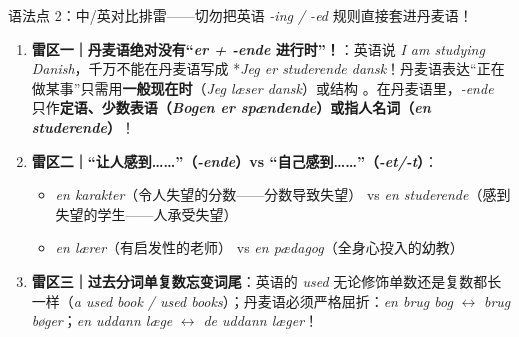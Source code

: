 \begin{grammatikbox}{语法点 2：中/英对比排雷——切勿把英语 \textit{-ing / -ed} 规则直接套进丹麦语！}
\begin{enumerate}
  \item \textbf{雷区一｜丹麦语绝对没有“\textit{er + -ende} 进行时”！}：英语说 \textit{I am studying Danish}，千万不能在丹麦语写成 *\textit{Jeg er studerende dansk}！丹麦语表达“正在做某事”只需用\textbf{一般现在时}（\textit{Jeg læser dansk}）或结构 。在丹麦语里，\textit{-ende} 只作\textbf{定语、少数表语（\textit{Bogen er spændende}）或指人名词（\textit{en studerende}）}！
  \item \textbf{雷区二｜“让人感到……”（\textit{-ende}）vs “自己感到……”（\textit{-et/-t}）}：
    \begin{itemize}
      \item \textit{en  karakter}（令人失望的分数——分数导致失望） vs \textit{en  studerende}（感到失望的学生——人承受失望）
      \item \textit{en  lærer}（有启发性的老师） vs \textit{en  pædagog}（全身心投入的幼教）
    \end{itemize}
  \item \textbf{雷区三｜过去分词单复数忘变词尾}：英语的 \textit{used} 无论修饰单数还是复数都长一样（\textit{a used book / used books}）；丹麦语必须严格屈折：\textit{en brug bog} $\leftrightarrow$ \textit{brug bøger}；\textit{en uddann læge} $\leftrightarrow$ \textit{de uddann læger}！
\end{enumerate}
\end{grammatikbox}


